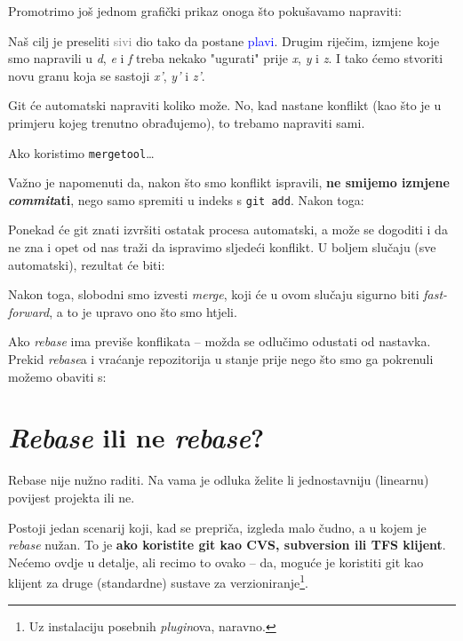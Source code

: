Promotrimo još jednom grafički prikaz onoga što pokušavamo napraviti:



Naš cilj je preseliti \textcolor{gray}{sivi} dio tako da postane \textcolor{blue}{plavi}.
Drugim riječim, izmjene koje smo napravili u \emph d, \emph e i \emph f treba nekako "ugurati" prije \emph x, \emph y i \emph z.
I tako ćemo stvoriti novu granu koja se sastoji \emph{x'}, \emph{y'} i \emph{z'}.

Git će automatski napraviti koliko može.
No, kad nastane konflikt (kao što je u primjeru kojeg trenutno obrađujemo), to trebamo napraviti sami.

Ako koristimo \verb+mergetool+\dots



Važno je napomenuti da, nakon što smo konflikt ispravili, \textbf{ne smijemo izmjene \emph{commit}ati}, nego samo spremiti u indeks s \verb+git add+.
Nakon toga:


Ponekad će git znati izvršiti ostatak procesa automatski, a može se dogoditi i da ne zna i opet od nas traži da ispravimo sljedeći konflikt.
U boljem slučaju (sve automatski), rezultat će biti:



Nakon toga, slobodni smo izvesti \emph{merge}, koji će u ovom slučaju sigurno biti \emph{fast-forward}, a to je upravo ono što smo htjeli.

Ako \emph{rebase} ima previše konflikata -- možda se odlučimo odustati od nastavka.
Prekid \emph{rebase}a i vraćanje repozitorija u stanje prije nego što smo ga pokrenuli možemo obaviti s:


\section*{\emph{Rebase} ili ne \emph{rebase}?}

Rebase nije nužno raditi.
Na vama je odluka želite li jednostavniju (linearnu) povijest projekta ili ne.

Postoji jedan scenarij koji, kad se prepriča, izgleda malo čudno, a u kojem je \emph{rebase} nužan.
To je \textbf{ako koristite git kao CVS, subversion ili TFS klijent}.
Nećemo ovdje u detalje, ali recimo to ovako -- da, moguće je koristiti git kao klijent za druge (standardne) sustave za verzioniranje\footnote{Uz instalaciju posebnih \emph{plugin}ova, naravno.}.

